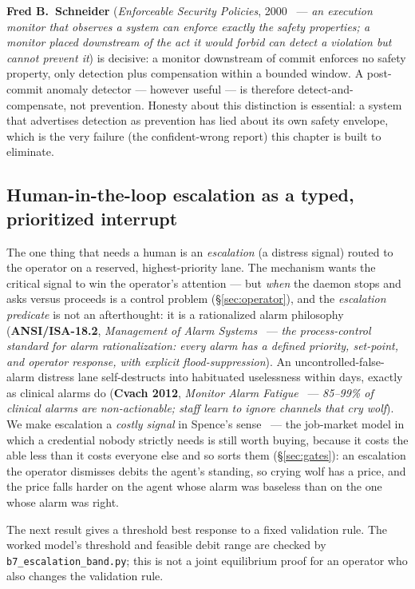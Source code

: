 \documentclass[11pt,a4paper]{article}
\theoremstyle{definition}
\theoremstyle{plain}
\begin{document}
\textbf{Fred B.\ Schneider} (\emph{Enforceable Security Policies},
2000~ --- \emph{an execution monitor that observes a system can
enforce exactly the safety properties; a monitor placed downstream of the act it
would forbid can detect a violation but cannot prevent it}) is decisive: a monitor
downstream of commit enforces no safety property, only detection plus compensation
within a bounded window. A post-commit anomaly detector --- however useful --- is
therefore detect-and-compensate, not prevention. Honesty about this distinction is
essential: a system that advertises detection as prevention has lied about its own
safety envelope, which is the very failure (the confident-wrong report) this chapter is
built to eliminate.

\subsection{Human-in-the-loop escalation as a typed, prioritized interrupt}\label{sec:escalation}

The one thing that needs a human is an \emph{escalation} (a distress signal) routed
to the operator on a reserved, highest-priority lane. The mechanism wants the
critical signal to win the operator's attention --- but \emph{when} the daemon
stops and asks versus proceeds is a control problem (\S\ref{sec:operator}), and the
\emph{escalation predicate} is not an afterthought: it is a rationalized alarm
philosophy (\textbf{ANSI/ISA-18.2}, \emph{Management of Alarm
Systems}~ --- \emph{the process-control standard for alarm
rationalization: every alarm has a defined priority, set-point, and operator
response, with explicit flood-suppression}). An uncontrolled-false-alarm distress
lane self-destructs into habituated uselessness within days, exactly as clinical
alarms do (\textbf{Cvach 2012}, \emph{Monitor Alarm Fatigue}~ ---
\emph{85--99\% of clinical alarms are non-actionable; staff learn to ignore channels
that cry wolf}). We make escalation a \emph{costly signal} in Spence's
sense~ --- the job-market model in which a credential nobody
strictly needs is still worth buying, because it costs the able less than it
costs everyone else and so sorts them (\S\ref{sec:gates}): an escalation the
operator dismisses debits the agent's standing, so crying wolf has a price, and
the price falls harder on the agent whose alarm was baseless than on the one
whose alarm was right.

The next result gives a threshold best response to a fixed validation rule.
The worked model's threshold and feasible debit range are checked by
\texttt{b7\_escalation\_band.py}; this is not a joint equilibrium proof for an
operator who also changes the validation rule.
\end{document}
